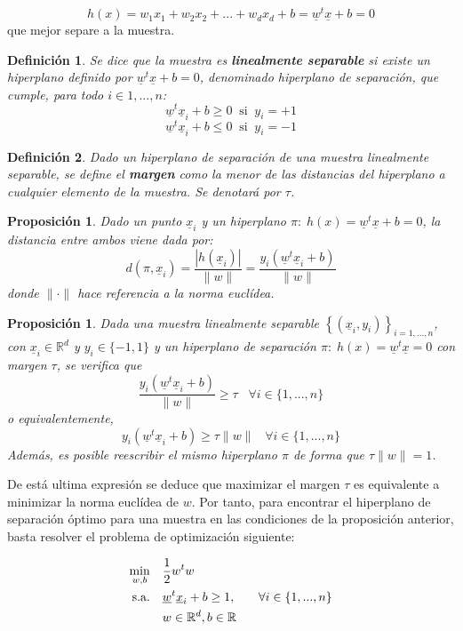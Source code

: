 \documentclass[12pt,a4paper,]{book}
\newcounter{dummy}
\numberwithin{dummy}{section}
\theoremstyle{ocrenumbox}
\theoremstyle{blacknumex}
\theoremstyle{blacknumbox}
\newtheorem{definitionT}{Definición}[section]  %
\theoremstyle{ocrenum}
\newtheorem{proposition}[dummy]{Proposición} %
\newenvironment{definition}{\begin{dBox}\begin{definitionT}}{\end{definitionT}\end{dBox}}
\theoremstyle{ocrenum}
\begin{document}
\[h(x) = w_1x_1 +w_2x_2+...+w_dx_d +b = \underline w^t \underline x + b= 0 \]
que mejor separe a la muestra.

\begin{definition}
Se dice que la muestra es  \textbf{linealmente separable} si existe un hiperplano definido por $\underline w^t \underline x + b= 0$, denominado hiperplano de separación, que cumple, para todo $i \in 1,...,n$:
$$\underline w^t \underline x_i + b \ge 0 \; \; \text{si} \;\; y_i=+1$$
$$\underline w^t \underline x_i + b \le 0 \; \; \text{si} \;\; y_i=-1$$
\end{definition}

\begin{definition}
Dado un hiperplano de separación de una muestra linealmente separable, se define el  \textbf{margen} como la menor de las distancias del hiperplano a cualquier elemento de la muestra. Se denotará por $\tau$.
\end{definition}

\begin{proposition}
Dado un punto $\underline x_i$ y un hiperplano $\pi :\;h(x) = \underline w^t \underline x + b= 0$, la distancia entre ambos viene dada por:
$$d(\pi,\underline x_i) = \frac{|h(\underline x_i)|}{\|w\|} = \frac{y_i(\underline w^t \underline x_i+b)}{\|w\|}$$
donde $\|\cdot\|$ hace referencia a la norma euclídea.
\end{proposition}

\begin{proposition}
Dada una muestra linealmente separable $\left\{(\underline x_i,y_i) \right\}_{i=1,...,n}$, con $\underline x_i \in \mathbb{R}^d$ y $y_i \in \{-1,1\}$ y un hiperplano de separación $\pi :\;h(x) = \underline w^t \underline x = 0$ con margen $\tau$, se verifica que
$$\frac{y_i(\underline w^t \underline x_i+b)}{\|w\|} \ge \tau \;\;\; \forall i\in \{1,...,n\}$$
o equivalentemente,
$$y_i(\underline w^t \underline x_i+b) \ge \tau\|w\| \;\;\; \forall i\in \{1,...,n\}$$
Además, es posible reescribir el mismo hiperplano $\pi$ de forma que $\tau\|w\| = 1$.
\end{proposition}

De está ultima expresión se deduce que maximizar el margen \(\tau\) es
equivalente a minimizar la norma euclídea de \(w\). Por tanto, para
encontrar el hiperplano de separación óptimo para una muestra en las
condiciones de la proposición anterior, basta resolver el problema de
optimización siguiente:

\begin{equation}
\begin{aligned}
\min_{w,b} \quad & \frac{1}{2}w^{t}w\\
\textrm{s.a.} \quad & \underline w^t \underline x_i+b \ge 1, \quad & \forall i\in \{1,...,n\} \\
  & w \in \mathbb{R}^d, \space b \in \mathbb{R} \\ 
\end{aligned}
\end{equation}
\end{document}
